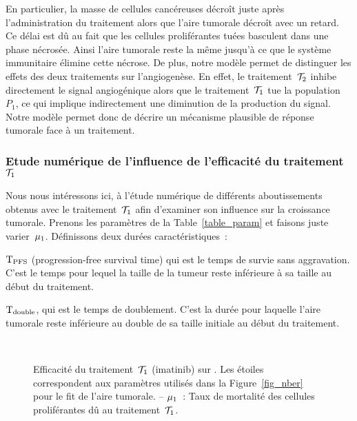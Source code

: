 \documentclass[main.tex]{subfiles}
\begin{document}
En particulier, la masse de cellules cancéreuses décroît juste après l'administration du traitement alors que l'aire tumorale décroît avec un retard. 
Ce délai est dû au fait que les cellules proliférantes tuées basculent dans une phase nécrosée. Ainsi l'aire tumorale reste la même jusqu'à ce que le système immunitaire élimine cette nécrose. 
De plus, notre modèle permet de distinguer les effets des deux traitements sur l'angiogenèse. 
En effet, le traitement~${\mathcal T_2}$ inhibe directement le signal angiogénique alors que le  traitement~${\mathcal T_1}$ tue la population~$P_1$, ce qui implique indirectement une diminution de la production du signal. 
Notre modèle permet donc de décrire un mécanisme plausible de réponse tumorale face à un traitement. 

\subsubsection{Etude numérique de l'influence de l'efficacité du traitement~${\mathcal T_1}$}\label{subsec:NumEff}
Nous nous intéressons ici, à l'étude numérique de différents aboutissements obtenus avec le 
traitement~${\mathcal T_1}$ afin d'examiner son influence sur la croissance tumorale. 
Prenons les paramètres de la Table~\ref{table_param} et faisons juste varier~$\mu_1$. 
Définissons deux durées caractéristiques~:
\begin{myitemize}
\item ${\rm T_{PFS}}$ (progression-free survival time) qui est le temps de survie sans aggravation. C'est le temps pour lequel la taille de la tumeur reste inférieure à sa taille au début du traitement.  
\item ${\rm T_{double}}$, qui est le temps de doublement. C'est la durée pour laquelle l'aire tumorale reste inférieure au double de sa taille initiale au début du traitement. 
\end{myitemize}
\begin{figure}[!htb]
\centering
\captionsetup[subfigure]{margin=10pt}
\\
\caption{Efficacité du traitement~${\mathcal T_1}$ (imatinib) sur \Nber. Les étoiles correspondent aux paramètres utilisés dans la Figure~\ref{fig_nber} pour le fit de l'aire tumorale. -- $\mu_1$~: Taux de mortalité des cellules proliférantes dû au traitement~${\mathcal T_1}$. \label{fig:eff_glivec_nber}}
\end{figure}
\end{document}

